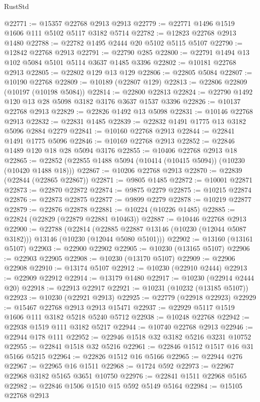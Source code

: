 \begin{lexlean}{RustStd}
\begin{coremodule}
@22771 := @15357 @22768 @2913 @2913
@22779 := @22771 @1496 @1519 @1606 @111 @5102 @5117 @3182 @5714
@22782 := @12823 @22768 @2913 @1480
@22788 := @22782 @1495 @2444 @20 @5102 @5115 @5107
@22790 := @12842 @22768 @2913
@22791 := @22790 @285
@22800 := @22791 @1494 @13 @102 @5084 @5101 @5114 @3637 @1485 @3396
@22802 := @10181 @22768 @2913
@22805 := @22802 @129 @13 @129
@22806 := @22805 @5084
@22807 := @10190 @22768
@22809 := @10189 (@22807 @129)
@22813 := @22806 @22809 (@10197 (@10198 @5084))
@22814 := @22800 @22813
@22824 := @22790 @1492 @120 @13 @28 @5098 @3182 @3176 @3637 @1537 @3396
@22826 := @10137 @22768 @2913
@22829 := @22826 @1492 @13 @5098
@22831 := @10146 @22768 @2913
@22832 := @22831 @1485
@22839 := @22832 @1491 @1775 @13 @3182 @5096 @2884 @2279
@22841 := @10160 @22768 @2913
@22844 := @22841 @1491 @1775 @5096
@22846 := @10169 @22768 @2913
@22852 := @22846 @1489 @120 @18 @28 @5094 @3176
@22855 := @10406 @22768 @2913 @18
@22865 := @22852 (@22855 @1488 @5094 (@10414 (@10415 @5094)) (@10230 (@10420 @1488 @18)))
@22867 := @10206 @22768 @2913
@22870 := @22839 (@22844 (@22865 @22867))
@22871 := @9805 @1485
@22872 := @10001 @22871
@22873 := @22870 @22872
@22874 := @9875 @2279
@22875 := @10215 @22874
@22876 := @22873 @22875
@22877 := @9899 @2279
@22878 := @10219 @22877
@22879 := @22876 @22878
@22881 := @10224 (@10226 @1485)
@22885 := @22824 (@22829 (@22879 @22881 @10463))
@22887 := @10446 @22768 @2913
@22900 := @22788
    (@22814
      (@22885 @22887 @13146 (@10230 (@12044 @5087 @3182)))
      @13146
      (@10230 (@12044 @5080 @5101)))
@22902 := @13160 (@13161 @5107)
@22903 := @22900 @22902
@22905 := @10230 (@13165 @5107)
@22906 := @22903 @22905
@22908 := @10230 (@13170 @5107)
@22909 := @22906 @22908
@22910 := @13174 @5107
@22912 := @10230 (@22910 @2444)
@22913 := @22909 @22912
@22914 := @13179 @1480
@22917 := @10230 (@22914 @2444 @20)
@22918 := @22913 @22917
@22921 := @10231 (@10232 (@13185 @5107))
@22923 := @10230 (@22921 @2913)
@22925 := @22779 (@22918 @22923)
@22929 := @15467 @22768 @2913 @2913 @15471
@22937 := @22929 @5117 @1519 @1606 @111 @3182 @5218 @5240 @5712
@22938 := @10248 @22768
@22942 := @22938 @1519 @111 @3182 @5217
@22944 := @10740 @22768 @2913
@22946 := @22944 @178 @111
@22952 := @22946 @1518 @32 @3182 @5216 @3231 @10752
@22955 := @22841 @1518 @32 @5216
@22961 := @22846 @1512 @1517 @16 @31 @5166 @5215
@22964 := @22826 @1512 @16 @5166
@22965 := @22944 @276
@22967 := @22965 @16 @1511
@22968 := @1724 @592
@22973 := @22967 @22968 @3182 @5165 @3651 @10750
@22976 := @22841 @1511 @22968 @5165
@22982 := @22846 @1506 @1510 @15 @592 @5149 @5164
@22984 := @15105 @22768 @2913

\end{coremodule}
\end{lexlean}
